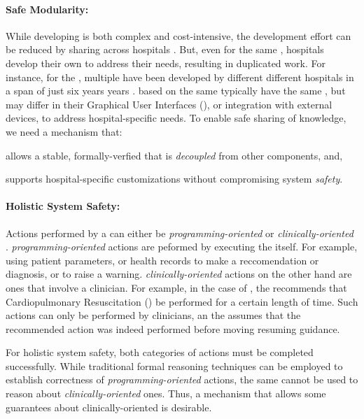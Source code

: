 \paragraph{Safe Modularity:}

While developing \CDSSs{} is both complex and cost-intensive,
the development effort can be reduced by sharing \CDSSs{} across hospitals \cite{PelegAMIA00}.
But, even for the same \BPG{}, hospitals develop their own \CDSSs{} to address
their needs, resulting in duplicated work.
For instance, for the \ACLS{} \BPG{}, multiple \CDSSs{} have been developed by different
different hospitals in a span of just six years years \cite{FullCodePro,PediAppRREST2020,
PediAppRREST2021,GuidingPad2017,GuidingPad2019, GuidingPad2020,DST2014,DST2019,ROSCo2021,TeamScreen2019,Wu2017}.
\CDSSs{} based on the same \BPG{} typically have the same \CIG{}, but may differ
in their Graphical User Interfaces (\GUIs), or integration with external
devices, to address hospital-specific needs.
To enable safe sharing of knowledge, we need a mechanism that:
\begin{enumerate*}[label=(\alph*)]
  \item allows a stable, formally-verfied \CIG{} that is \emph{decoupled} from other
    components, and,
  \item supports hospital-specific customizations without compromising system
    \emph{safety}.
\end{enumerate*}

\paragraph{Holistic System Safety:}

Actions performed by a \CDSS{} can either be \emph{programming-oriented}
or \emph{clinically-oriented} \cite{BoxwalaJBI04}. \emph{programming-oriented}
actions are peformed by executing the \CIG{} itself. For example,
using patient parameters, or health records to make a reccomendation or diagnosis,
or to raise a warning. \emph{clinically-oriented} actions on the other hand
are ones that involve a clinician. For example, in the case of \ACLS{},
the \CDSS{} recommends that Cardiopulmonary Resuscitation (\CPR{}) be performed
for a certain length of time. Such actions can only be performed by clinicians,
an the \CDSS{} assumes that the recommended action was indeed performed before
moving resuming guidance.

For holistic system safety, both categories of actions must be completed
successfully. While traditional formal reasoning techniques can be employed
to establish correctness of \emph{programming-oriented} actions, the same
cannot be used to reason about \emph{clinically-oriented} ones.
Thus, a mechanism that allows some guarantees about clinically-oriented is
desirable.


